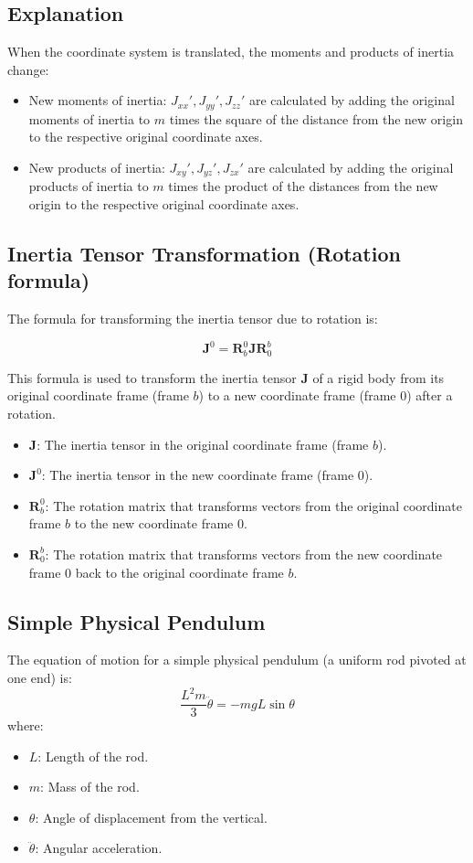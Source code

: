 \subsection{Explanation}
When the coordinate system is translated, the moments and products of inertia change:
\begin{itemize}
    \item New moments of inertia: \( J_{xx}', J_{yy}', J_{zz}' \) are calculated by adding the original moments of inertia to \( m \) times the square of the distance from the new origin to the respective original coordinate axes.
    \item New products of inertia: \( J_{xy}', J_{yz}', J_{zx}' \) are calculated by adding the original products of inertia to \( m \) times the product of the distances from the new origin to the respective original coordinate axes.
\end{itemize}

\subsection{Inertia Tensor Transformation (Rotation formula)}

The formula for transforming the inertia tensor due to rotation is:

\[ \mathbf{J}^0 = \mathbf{R}^0_b \mathbf{J} \mathbf{R}^b_0 \]

This formula is used to transform the inertia tensor \(\mathbf{J}\) of a rigid body from its original coordinate frame (frame \(b\)) to a new coordinate frame (frame \(0\)) after a rotation.

\begin{itemize}
    \item \(\mathbf{J}\): The inertia tensor in the original coordinate frame (frame \(b\)).
    \item \(\mathbf{J}^0\): The inertia tensor in the new coordinate frame (frame \(0\)).
    \item \(\mathbf{R}^0_b\): The rotation matrix that transforms vectors from the original coordinate frame \(b\) to the new coordinate frame \(0\).
    \item \(\mathbf{R}^b_0\): The rotation matrix that transforms vectors from the new coordinate frame \(0\) back to the original coordinate frame \(b\). 
\end{itemize}

\subsection{Simple Physical Pendulum}
The equation of motion for a simple physical pendulum (a uniform rod pivoted at one end) is:
\[
\frac{L^2 m}{3} \ddot{\theta} = -mgL \sin \theta
\]
where:
\begin{itemize}
    \item \( L \): Length of the rod.
    \item \( m \): Mass of the rod.
    \item \( \theta \): Angle of displacement from the vertical.
    \item \( \ddot{\theta} \): Angular acceleration.
\end{itemize}

